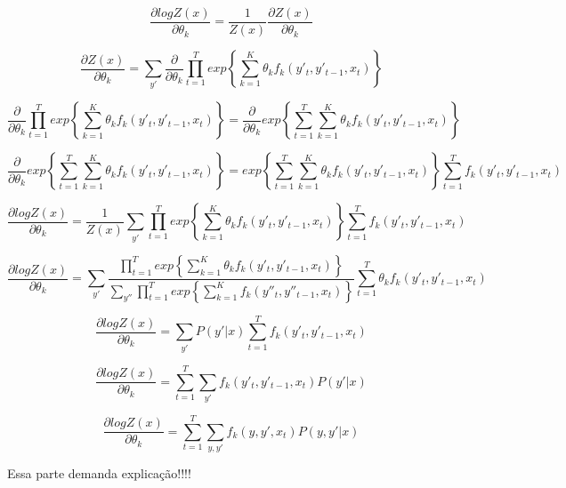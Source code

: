 \documentclass{article}
\begin{document}
\begin{equation}
\frac{\partial log Z(x)}{\partial \theta_k} = \frac{1}{Z(x)}\frac{\partial Z(x)}{\partial \theta_k}
\label{eq:5}
\end{equation}

\begin{equation}
\frac{\partial Z(x)}{\partial \theta_k} = \sum_{y'}\frac{\partial}{\partial \theta_k} \prod_{t=1}^{T}exp\left\{\sum_{k=1}^{K} \theta_k f_k(y'_t, y'_{t-1}, x_t)\right\}
\label{eq:6}
\end{equation}

\begin{equation}
\frac{\partial}{\partial \theta_k} \prod_{t=1}^{T}exp\left\{\sum_{k=1}^{K} \theta_k f_k(y'_t, y'_{t-1}, x_t)\right\} = 
\frac{\partial}{\partial \theta_k} exp\left\{\sum_{t=1}^{T}\sum_{k=1}^{K} \theta_k f_k(y'_t, y'_{t-1}, x_t)\right\}
\label{eq:7}
\end{equation}

\begin{equation}
\frac{\partial}{\partial \theta_k} exp\left\{\sum_{t=1}^{T}\sum_{k=1}^{K} \theta_k f_k(y'_t, y'_{t-1}, x_t)\right\} = 
exp\left\{\sum_{t=1}^{T}\sum_{k=1}^{K} \theta_k f_k(y'_t, y'_{t-1}, x_t)\right\} \sum_{t=1}^{T}f_k(y'_t, y'_{t-1}, x_t)
\label{eq:8}
\end{equation}

\begin{equation}
\frac{\partial log Z(x)}{\partial \theta_k} = \frac{1}{Z(x)}\sum_{y'}
\prod_{t=1}^{T} exp\left\{\sum_{k=1}^{K} \theta_k f_k(y'_t, y'_{t-1}, x_t)\right\} \sum_{t=1}^{T}f_k(y'_t, y'_{t-1}, x_t)
\label{eq:9}
\end{equation}

\begin{equation}
\frac{\partial log Z(x)}{\partial \theta_k} = \sum_{y'}
\frac{\prod_{t=1}^{T} exp\left\{\sum_{k=1}^{K} \theta_k f_k(y'_t, y'_{t-1}, x_t)\right\}}{\sum_{y''}\prod_{t=1}^{T}exp\left\{\sum_{k=1}^{K} f_k(y''_t, y''_{t-1}, x_t)\right\}}
\sum_{t=1}^{T}\theta_k f_k(y'_t, y'_{t-1}, x_t)
\label{eq:10}
\end{equation}

\begin{equation}
\frac{\partial log Z(x)}{\partial \theta_k} = \sum_{y'} P(y'|x) \sum_{t=1}^{T}f_k(y'_t, y'_{t-1}, x_t)
\label{eq:11}
\end{equation}

\begin{equation}
\frac{\partial log Z(x)}{\partial \theta_k} =  \sum_{t=1}^{T}\sum_{y'} f_k(y'_t, y'_{t-1}, x_t) P(y'|x)
\label{eq:12}
\end{equation}

\begin{equation}
\frac{\partial log Z(x)}{\partial \theta_k} =  \sum_{t=1}^{T}\sum_{y, y'} f_k(y, y', x_t) P(y, y'|x)
\label{eq:13}
\end{equation}

Essa parte demanda explicação!!!!

\end{document}
